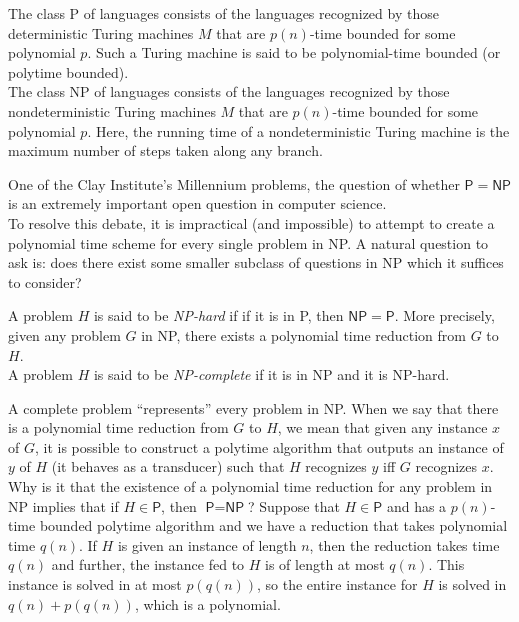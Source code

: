 	\begin{fdef}
		The class \textsf{P} of languages consists of the languages recognized by those deterministic Turing machines $M$ that are $p(n)$-time bounded for some polynomial $p$. Such a Turing machine is said to be polynomial-time bounded (or polytime bounded).\\
		The class \textsf{NP} of languages consists of the languages recognized by those nondeterministic Turing machines $M$ that are $p(n)$-time bounded for some polynomial $p$. Here, the running time of a nondeterministic Turing machine is the maximum number of steps taken along any branch. \\
	\end{fdef}

	One of the Clay Institute's Millennium problems, the question of whether $\mathsf{P} = \mathsf{NP}$ is an extremely important open question in computer science.\\
	To resolve this debate, it is impractical (and impossible) to attempt to create a polynomial time scheme for every single problem in \textsf{NP}. A natural question to ask is: does there exist some smaller subclass of questions in \textsf{NP} which it suffices to consider?

	\begin{fdef}
		A problem $H$ is said to be \emph{\textsf{NP}-hard} if if it is in \textsf{P}, then $\mathsf{NP} = \mathsf{P}$. More precisely, given any problem $G$ in \textsf{NP}, there exists a polynomial time reduction from $G$ to $H$.\\
		A problem $H$ is said to be \emph{\textsf{NP}-complete} if it is in \textsf{NP} and it is \textsf{NP}-hard.
	\end{fdef}

	A complete problem ``represents'' every problem in \textsf{NP}. When we say that there is a polynomial time reduction from $G$ to $H$, we mean that given any instance $x$ of $G$, it is possible to construct a polytime algorithm that outputs an instance of $y$ of $H$ (it behaves as a transducer) such that $H$ recognizes $y$ iff $G$ recognizes $x$.\\
	Why is it that the existence of a polynomial time reduction for any problem in \textsf{NP} implies that if $H \in \mathsf{P}$, then $\textsf{P} = \textsf{NP}$? Suppose that $H \in \mathsf{P}$ and has a $p(n)$-time bounded polytime algorithm and we have a reduction that takes polynomial time $q(n)$. If $H$ is given an instance of length $n$, then the reduction takes time $q(n)$ and further, the instance fed to $H$ is of length at most $q(n)$. This instance is solved in at most $p(q(n))$, so the entire instance for $H$ is solved in $q(n) + p(q(n))$, which is a polynomial.\\

